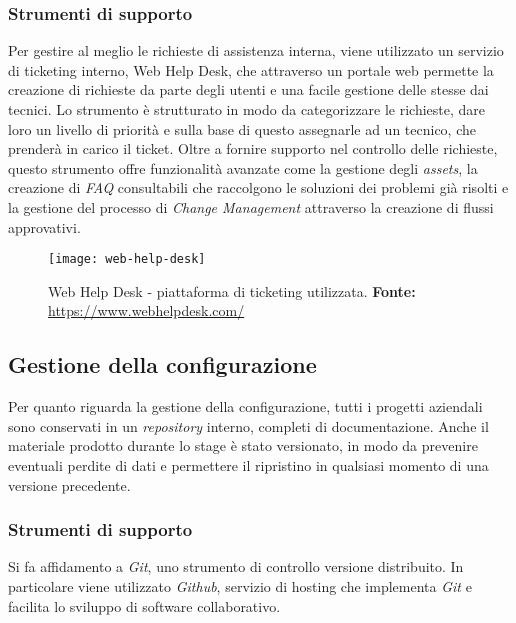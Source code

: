 \subsubsection{Strumenti di supporto}

Per gestire al meglio le richieste di assistenza interna, viene utilizzato un servizio di ticketing interno, Web Help Desk, che attraverso un portale web permette la creazione di richieste da parte degli utenti e una facile gestione delle stesse dai tecnici. Lo strumento è strutturato in modo da categorizzare le richieste, dare loro un livello di priorità e sulla base di questo assegnarle ad un tecnico, che prenderà in carico il ticket. Oltre a fornire supporto nel controllo delle richieste, questo strumento offre funzionalità avanzate come la gestione degli \textit{assets}, la creazione di \textit{FAQ} consultabili che raccolgono le soluzioni dei problemi già risolti e la gestione del processo di \textit{Change Management} attraverso la creazione di flussi approvativi.

\vspace{10pt}
\begin{figure}[htbp]
	\begin{center}
		\texttt{[image: web-help-desk]}
		\caption{Web Help Desk - piattaforma di ticketing utilizzata.\newline
		\textbf{Fonte: }\url{https://www.webhelpdesk.com/}}
	\end{center}
\end{figure}




\subsection{Gestione della configurazione}

Per quanto riguarda la gestione della configurazione, tutti i progetti aziendali sono conservati in un \textit{repository} interno, completi di documentazione. 
Anche il materiale prodotto durante lo stage è stato versionato, in modo da prevenire eventuali perdite di dati e permettere il ripristino in qualsiasi momento di una versione precedente.


\subsubsection{Strumenti di supporto}
Si fa affidamento a \textit{Git}, uno strumento di controllo versione distribuito. In particolare viene utilizzato \textit{Github}, servizio di hosting che implementa \textit{Git} e facilita lo sviluppo di software collaborativo.

